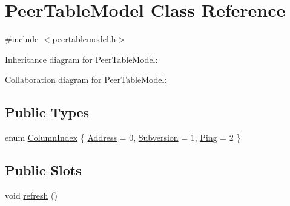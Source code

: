 \hypertarget{class_peer_table_model}{}\section{Peer\+Table\+Model Class Reference}
\label{class_peer_table_model}


{\ttfamily \#include $<$peertablemodel.\+h$>$}



Inheritance diagram for Peer\+Table\+Model\+:


Collaboration diagram for Peer\+Table\+Model\+:
\subsection*{Public Types}
\begin{DoxyCompactItemize}
\item 
enum \hyperlink{class_peer_table_model_a10a32ec5f31c9765c80b611760f7e590}{Column\+Index} \{ \hyperlink{class_peer_table_model_a10a32ec5f31c9765c80b611760f7e590a101063cc6b840d0857aa79929703d16a}{Address} = 0, 
\hyperlink{class_peer_table_model_a10a32ec5f31c9765c80b611760f7e590aa4408c536a178490700310f01cf0d455}{Subversion} = 1, 
\hyperlink{class_peer_table_model_a10a32ec5f31c9765c80b611760f7e590a7e5e92f542ecbb90307e99c213274957}{Ping} = 2
 \}
\end{DoxyCompactItemize}
\subsection*{Public Slots}
\begin{DoxyCompactItemize}
\item 
void \hyperlink{class_peer_table_model_abae14b3fd8a38a60f752f67a57b5b0b3}{refresh} ()
\end{DoxyCompactItemize}

